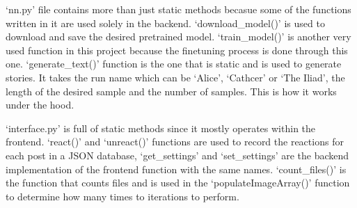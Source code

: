\documentclass[12pt]{report}
\begin{document}
\begin{appendices}
`nn.py' file contains more than just static methods becasue some of the functions written in it are used solely in the
backend. `download\_model()' is used to download and save the desired pretrained model. `train\_model()' is another very used function
in this project because the finetuning process is done through this one. `generate\_text()' function is the one that is
static and is used to generate stories. It takes the run name which can be `Alice', `Cathcer' or `The Iliad', the
length of the desired sample and the number of samples. This is how it works under the hood.

`interface.py' is full of static methods since it mostly operates within the frontend. `react()' and `unreact()' functions
are used to record the reactions for each post in a JSON database, `get\_settings' and `set\_settings' are the backend
implementation of the frontend function with the same names. `count\_files()' is the function that counts files and is used
in the `populateImageArray()' function to determine how many times to iterations to perform.

\end{appendices}

\end{document}
